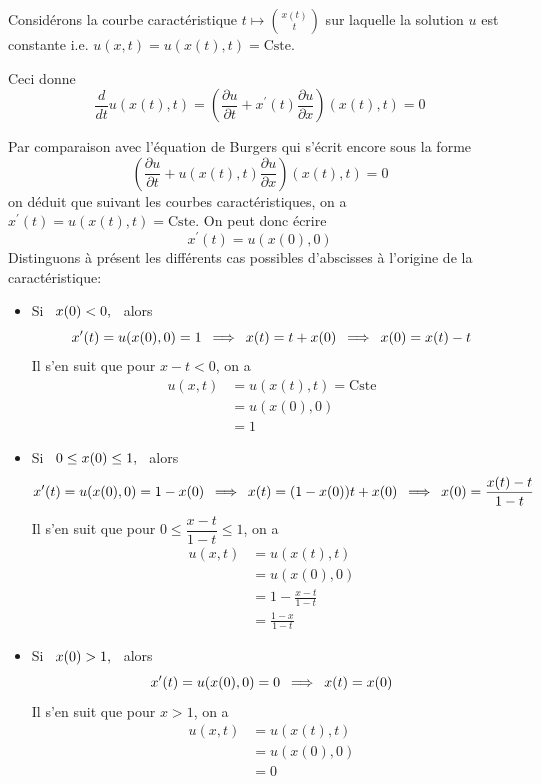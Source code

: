 \documentclass[
	french,
	11pt, %
]{fphw}
\newcommand{\hquad}{\hspace{0.5em}} %
\begin{document}
\noindent Considérons la courbe caractéristique $t \mapsto {x(t) \choose t}$ sur laquelle la solution $u$ est constante i.e. $u(x,t) = u(x(t), t) = \text{Cste}$.

\noindent Ceci donne 
$$
\frac{d}{dt} u(x(t), t) = \left( \frac{\partial u}{\partial t} + x^\prime(t) \frac{\partial u}{\partial x}  \right)(x(t), t) = 0 
$$

\noindent Par comparaison avec l'équation de Burgers qui s'écrit encore sous la forme 
$$ 
\left( \frac{\partial u}{\partial t} + u(x(t),t) \frac{\partial u}{\partial x}  \right)(x(t), t) = 0$$
on déduit que suivant les courbes caractéristiques, on a $x^\prime(t) = u(x(t), t) = \text{Cste}$. On peut donc écrire $$ x^\prime(t) = u(x(0),0) $$ 
Distinguons à présent les différents cas possibles d'abscisses à l'origine de la caractéristique:
\begin{itemize}
	\item Si   $ \hquad x(0) < 0, \hquad$ alors
	$$x^\prime(t) = u(x(0),0) = 1 \hquad \Longrightarrow \hquad x(t) = t+x(0) \hquad \Longrightarrow \hquad x(0)=x(t)-t $$
	Il s'en suit que pour $x-t<0$, on a 
	\begin{align*}
		u(x,t) &= u(x(t), t) = \text{Cste} \\
		&= u(x(0),0)  \\
		&=1
	\end{align*}

	\item Si   $\hquad 0 \leq x(0) \leq 1, \hquad$ alors
	$$x^\prime(t) = u(x(0),0) = 1-x(0) \hquad \Longrightarrow \hquad x(t) = (1-x(0))t+x(0) \hquad \Longrightarrow \hquad x(0) = \frac{x(t)-t}{1-t} $$
	Il s'en suit que pour $ 0 \leq \dfrac{x-t}{1-t} \leq 1$, on a 
	\begin{align*}
		u(x,t) &= u(x(t), t)\\
		&= u(x(0),0)  \\
		&=1 - \frac{x-t}{1-t} \\
		&= \frac{1-x}{1-t}
	\end{align*}

	\item Si   $\hquad x(0) > 1, \hquad$ alors
	$$x^\prime(t) = u(x(0),0) = 0 \hquad \Longrightarrow \hquad x(t) = x(0) $$
	Il s'en suit que pour $x>1$, on a 
	\begin{align*}
		u(x,t) &= u(x(t), t)\\
		&= u(x(0),0)  \\
		&=0
	\end{align*}

\end{itemize}
\end{document}
